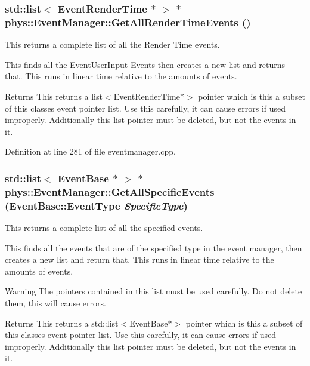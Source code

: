 \hypertarget{classphys_1_1EventManager_aee73dff2d113826b8c01db7f7417d527}{
\subsubsection[{GetAllRenderTimeEvents}]{\setlength{\rightskip}{0pt plus 5cm}std::list$<$ {\bf EventRenderTime} $\ast$ $>$ $\ast$ phys::EventManager::GetAllRenderTimeEvents ()}}
\label{da/dde/classphys_1_1EventManager_aee73dff2d113826b8c01db7f7417d527}


This returns a complete list of all the Render Time events. 

This finds all the \hyperlink{classphys_1_1EventUserInput}{EventUserInput} Events then creates a new list and returns that. This runs in linear time relative to the amounts of events. \begin{DoxyReturn}{Returns}
This returns a list$<$EventRenderTime$\ast$$>$ pointer which is this a subset of this classes event pointer list. Use this carefully, it can cause errors if used improperly. Additionally this list pointer must be deleted, but not the events in it. 
\end{DoxyReturn}


Definition at line 281 of file eventmanager.cpp.

\hypertarget{classphys_1_1EventManager_a300e537d27cd53ac8276438d4c91a3f6}{
\subsubsection[{GetAllSpecificEvents}]{\setlength{\rightskip}{0pt plus 5cm}std::list$<$ {\bf EventBase} $\ast$ $>$ $\ast$ phys::EventManager::GetAllSpecificEvents ({\bf EventBase::EventType} {\em SpecificType})}}
\label{da/dde/classphys_1_1EventManager_a300e537d27cd53ac8276438d4c91a3f6}


This returns a complete list of all the specified events. 

This finds all the events that are of the specified type in the event manager, then creates a new list and return that. This runs in linear time relative to the amounts of events. \begin{DoxyWarning}{Warning}
The pointers contained in this list must be used carefully. Do not delete them, this will cause errors. 
\end{DoxyWarning}
\begin{DoxyReturn}{Returns}
This returns a std::list$<$EventBase$\ast$$>$ pointer which is this a subset of this classes event pointer list. Use this carefully, it can cause errors if used improperly. Additionally this list pointer must be deleted, but not the events in it. 
\end{DoxyReturn}


